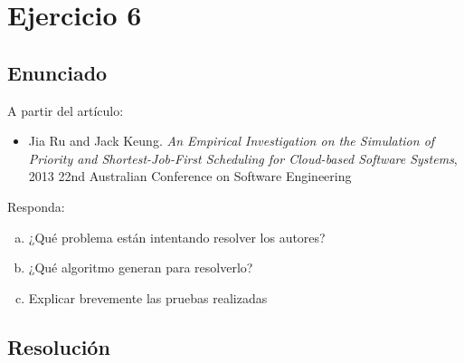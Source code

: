 \section{Ejercicio 6}

\subsection{Enunciado}
A partir del artículo:

\begin{itemize}
\item Jia Ru and Jack Keung. \textit{An Empirical Investigation on the Simulation of Priority and Shortest-Job-First Scheduling for Cloud-based Software Systems}, 2013 22nd Australian Conference on Software Engineering
\end{itemize}

Responda:

\begin{enumerate}[a)]
\item ¿Qué problema están intentando resolver los autores?
\item ¿Qué algoritmo generan para resolverlo?
\item Explicar brevemente las pruebas realizadas
\end{enumerate}

\subsection{Resolución}